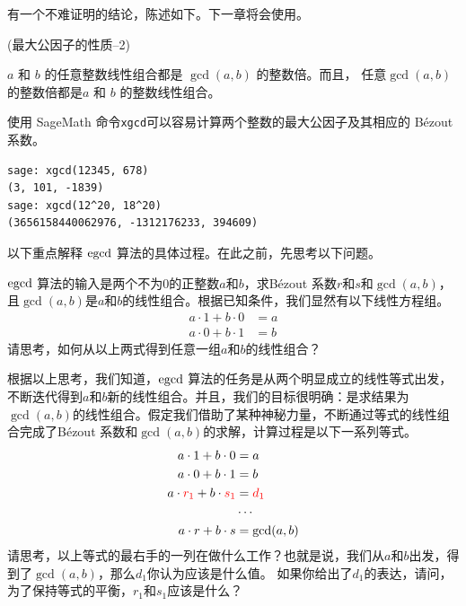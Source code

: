 有一个不难证明的结论，陈述如下。下一章将会使用。
\begin{property}{(最大公因子的性质--2)}
\label{prop:gcd2}
\begin{center}
	\begin{tcolorbox}[colback=green!5!white, colframe=red!75!black,width = 11cm]
$a$ 和 $b$ 的任意整数线性组合都是 $\gcd(a,b)$ 的整数倍。而且，
任意$\gcd(a,b)$ 的整数倍都是$a$ 和 $b$ 的整数线性组合。
	\end{tcolorbox}
	\end{center}
\end{property}

\begin{example}
\label{exm:egcd-in-sage}
使用 SageMath 命令\lstinline{xgcd}可以容易计算两个整数的最大公因子及其相应的 B\'{e}zout 系数。
\begin{lstlisting}
sage: xgcd(12345, 678)
(3, 101, -1839)
sage: xgcd(12^20, 18^20)
(3656158440062976, -1312176233, 394609)
\end{lstlisting}
\end{example}

以下重点解释 $\operatorname{egcd}$ 算法的具体过程。在此之前，先思考以下问题。
\begin{thinking}
	$\operatorname{egcd}$ 算法的输入是两个不为$0$的正整数$a$和$b$，求B\'{e}zout 系数$r$和$s$和$\gcd(a,b)$，且$\gcd(a,b)$是$a$和$b$的线性组合。根据已知条件，我们显然有以下线性方程组。
		\begin{align*}
		a\cdot 1 + b\cdot 0 &= a \\
		a\cdot 0 + b\cdot 1 &= b 
	\end{align*}
	请思考，如何从以上两式得到任意一组$a$和$b$的线性组合？
\end{thinking}

\begin{thinking}
	根据以上思考，我们知道，$\operatorname{egcd}$ 算法的任务是从两个明显成立的线性等式出发，不断迭代得到$a$和$b$新的线性组合。并且，我们的目标很明确：是求结果为$\gcd(a,b)$的线性组合。假定我们借助了某种神秘力量，不断通过等式的线性组合完成了B\'{e}zout 系数和$\gcd(a,b)$的求解，计算过程是以下一系列等式。
	\begin{align*}
		a\cdot 1  + b\cdot 0 &= a  \\
		a\cdot 0 + b\cdot 1 &= b  \\
		a\cdot \mathcolor{red}{r_1} + b \cdot \mathcolor{red}{s_1} &= \mathcolor{red}{d_1}  \\ 
		&\cdots \\
		a \cdot r + b\cdot s &= \gcd(a,b)
	\end{align*}
	请思考，以上等式的最右手的一列在做什么工作？也就是说，我们从$a$和$b$出发，得到了$\gcd(a,b)$，那么$d_1$你认为应该是什么值。
	如果你给出了$d_1$的表达，请问，为了保持等式的平衡，$r_1$和$s_1$应该是什么？
\end{thinking}

